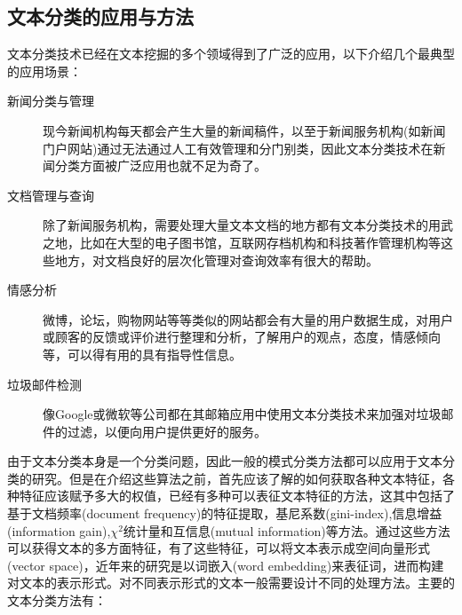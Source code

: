 \documentclass[UTF8]{ctexart}
\begin{document}
\subsection{文本分类的应用与方法}
    \par 文本分类技术已经在文本挖掘的多个领域得到了广泛的应用，以下介绍几个最典型的应用场景：
    \begin{description}
    	\item[新闻分类与管理] 现今新闻机构每天都会产生大量的新闻稿件，以至于新闻服务机构(如新闻门户网站)通过无法通过人工有效管理和分门别类，因此文本分类技术在新闻分类方面被广泛应用也就不足为奇了。 
    	\item[文档管理与查询] 除了新闻服务机构，需要处理大量文本文档的地方都有文本分类技术的用武之地，比如在大型的电子图书馆，互联网存档机构和科技著作管理机构等这些地方，对文档良好的层次化管理对查询效率有很大的帮助。
    	\item[情感分析] 微博，论坛，购物网站等等类似的网站都会有大量的用户数据生成，对用户或顾客的反馈或评价进行整理和分析，了解用户的观点，态度，情感倾向等，可以得有用的具有指导性信息。
    	\item[垃圾邮件检测] 像Google或微软等公司都在其邮箱应用中使用文本分类技术来加强对垃圾邮件的过滤，以便向用户提供更好的服务。
    \end{description}
	\par 由于文本分类本身是一个分类问题，因此一般的模式分类方法都可以应用于文本分类的研究。但是在介绍这些算法之前，首先应该了解的如何获取各种文本特征，各种特征应该赋予多大的权值，已经有多种可以表征文本特征的方法，这其中包括了基于文档频率(document frequency)的特征提取，基尼系数(gini-index),信息增益(information gain),$\chi^2$统计量和互信息(mutual information)等方法。通过这些方法可以获得文本的多方面特征，有了这些特征，可以将文本表示成空间向量形式(vector space)，近年来的研究是以词嵌入(word embedding)来表征词，进而构建对文本的表示形式。对不同表示形式的文本一般需要设计不同的处理方法。主要的文本分类方法有：
\end{document}
